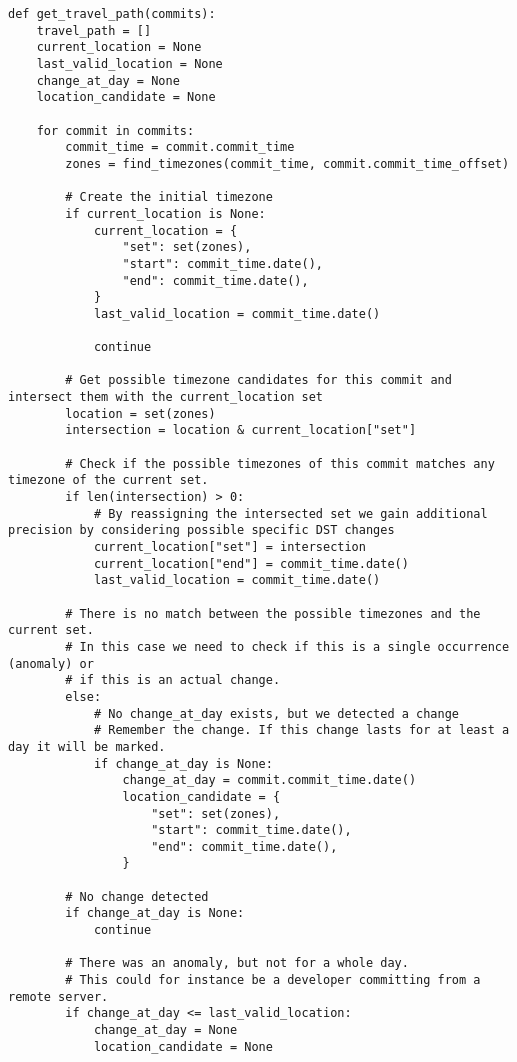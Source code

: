 \begin{verbatim}
def get_travel_path(commits):
    travel_path = []
    current_location = None
    last_valid_location = None
    change_at_day = None
    location_candidate = None

    for commit in commits:
        commit_time = commit.commit_time
        zones = find_timezones(commit_time, commit.commit_time_offset)

        # Create the initial timezone
        if current_location is None:
            current_location = {
                "set": set(zones),
                "start": commit_time.date(),
                "end": commit_time.date(),
            }
            last_valid_location = commit_time.date()

            continue

        # Get possible timezone candidates for this commit and intersect them with the current_location set
        location = set(zones)
        intersection = location & current_location["set"]

        # Check if the possible timezones of this commit matches any timezone of the current set.
        if len(intersection) > 0:
            # By reassigning the intersected set we gain additional precision by considering possible specific DST changes
            current_location["set"] = intersection
            current_location["end"] = commit_time.date()
            last_valid_location = commit_time.date()

        # There is no match between the possible timezones and the current set.
        # In this case we need to check if this is a single occurrence (anomaly) or
        # if this is an actual change.
        else:
            # No change_at_day exists, but we detected a change
            # Remember the change. If this change lasts for at least a day it will be marked.
            if change_at_day is None:
                change_at_day = commit.commit_time.date()
                location_candidate = {
                    "set": set(zones),
                    "start": commit_time.date(),
                    "end": commit_time.date(),
                }

        # No change detected
        if change_at_day is None:
            continue

        # There was an anomaly, but not for a whole day.
        # This could for instance be a developer committing from a remote server.
        if change_at_day <= last_valid_location:
            change_at_day = None
            location_candidate = None


\end{verbatim}
